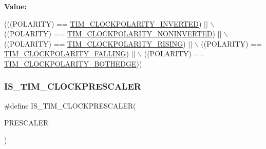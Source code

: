 {\bfseries Value\+:}
\begin{DoxyCode}
(((POLARITY) == \mbox{\hyperlink{group___t_i_m___clock___polarity_gae4eb585c466c2b5709ae3795204e7d3f}{TIM\_CLOCKPOLARITY\_INVERTED}})    || \(\backslash\)
                                        ((POLARITY) == 
      \mbox{\hyperlink{group___t_i_m___clock___polarity_gaca342866be2f9364274584688c733b60}{TIM\_CLOCKPOLARITY\_NONINVERTED}}) || \(\backslash\)
                                        ((POLARITY) == \mbox{\hyperlink{group___t_i_m___clock___polarity_ga13cc7002cfa5ee42607e1a3d85f77b10}{TIM\_CLOCKPOLARITY\_RISING}})   
         || \(\backslash\)
                                        ((POLARITY) == \mbox{\hyperlink{group___t_i_m___clock___polarity_ga9c17ca08b6179792f5ced4e607808c0a}{TIM\_CLOCKPOLARITY\_FALLING}}) 
          || \(\backslash\)
                                        ((POLARITY) == 
      \mbox{\hyperlink{group___t_i_m___clock___polarity_ga89bf9a7962d09fb58ceae4d1e28e1c89}{TIM\_CLOCKPOLARITY\_BOTHEDGE}}))
\end{DoxyCode}
\mbox{\label{group___t_i_m___i_s___t_i_m___definitions_gadf2164595c18d16cd5e34c81cd732760}} 
\subsubsection{\texorpdfstring{I\+S\+\_\+\+T\+I\+M\+\_\+\+C\+L\+O\+C\+K\+P\+R\+E\+S\+C\+A\+L\+ER}{IS\_TIM\_CLOCKPRESCALER}}
{\footnotesize\ttfamily \#define I\+S\+\_\+\+T\+I\+M\+\_\+\+C\+L\+O\+C\+K\+P\+R\+E\+S\+C\+A\+L\+ER(\begin{DoxyParamCaption}\item[{}]{P\+R\+E\+S\+C\+A\+L\+ER }\end{DoxyParamCaption})}

